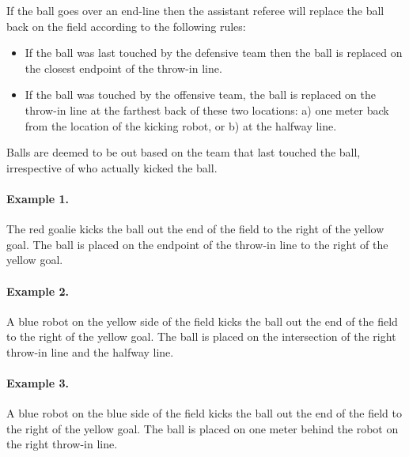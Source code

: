 \documentclass[12pt]{article}
\begin{document}
If the ball goes over an end-line then the assistant referee will replace the ball back on the field according to the following rules:

\begin{itemize}

\item If the ball was last touched by the defensive team then the ball is replaced on the closest endpoint of the throw-in line.

\item If the ball was touched by the offensive team, the ball is replaced on
the throw-in line at the farthest back of these two locations: a) one
meter back from the location of the kicking robot, or b) at the halfway
line.


\end{itemize}

Balls are deemed to be out based on the team that last touched the ball, irrespective of who actually kicked the ball.

\paragraph{Example 1.} The red goalie kicks the ball out the end of the field to the right of the yellow goal. The ball is placed on the endpoint of the throw-in line to the right of the yellow goal.

\paragraph{Example 2.} A blue robot on the yellow side of the field kicks the ball out the end of the field to the right of the yellow goal. The ball is placed on the intersection of the right throw-in line and the halfway line.

\paragraph{Example 3.} A blue robot on the blue side of the field kicks the ball out the end of the field to the right of the yellow goal. The ball is placed on one meter behind the robot on the right throw-in line.
\end{document}
